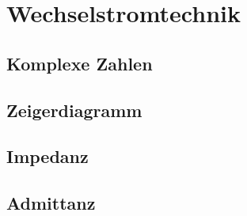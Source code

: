 \chapter{Wechselstromtechnik}

\section{Komplexe Zahlen}

\section{Zeigerdiagramm}

\section{Impedanz}

\section{Admittanz}